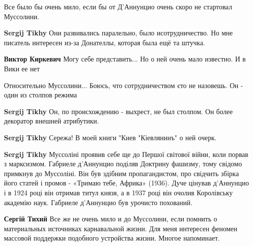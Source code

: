  
 
 
 
 
\zzSecCmt

\begin{itemize} %
Все было бы очень мило, если бы от Д’Аннунцио очень скоро не стартовал Муссолини.

\begin{itemize} %
\textbf{Sergij Tikhy} Они развивались паралельно, было исотрудничество. Но мне писатель интересен из-за Донателлы, которая была ещё та штучка.

\begin{itemize} %
\textbf{Виктор Киркевич} Могу себе представить... Но о ней очень мало известно. И в Вики ее нет

Относительно Муссолини... Боюсь, что сотрудничеством єто не назовешь. Он - один из столпов режима

\textbf{Sergij Tikhy} Он, по происхождению - выхрест, не был столпом. Он более декоратор внешней атрибутики.

\textbf{Sergij Tikhy} Сережа! В моей книги "Киев "Кіевлянинъ" о ней очерк.
\end{itemize} %

\textbf{Sergij Tikhy} Муссоліні проявив себе ще до Першої світової війни, коли порвав з марксизмом.
Габриеле д’Аннунцио поділяв Доктрину фашизму, тому свідомо примкнув до Муссоліні. Він був здібним пропагандистом, про свідчить збірка його статей і промов - «Тримаю тебе, Африка» (1936).
Дуче цінував д’Аннунцио і в 1924 році він отримав титул князя, а в 1937 році він очолив Королівську академію наук.
Габриеле д’Аннунцио був урочисто похований.

\textbf{Сергій Тихий} Все же не очень мило и до Муссолини, если помнить о материальных источниках карнавальной жизни. Для меня интересен феномен массовой поддержки подобного устройства жизни. Многое напоминает.

\end{itemize} %


\end{itemize}
